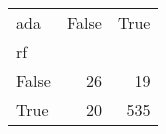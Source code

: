 \begin{tabular}{lrr}
\toprule
ada &  False &  True  \\
rf    &        &        \\
\midrule
False &     26 &     19 \\
True  &     20 &    535 \\
\bottomrule
\end{tabular}

